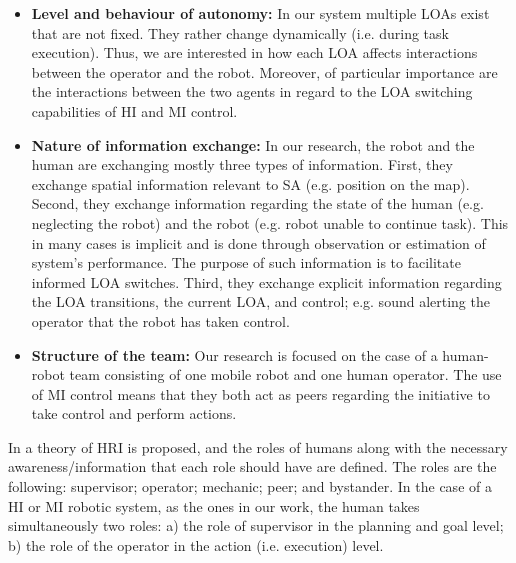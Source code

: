 \documentclass[a4paper,12pt,oneside,openright]{bhamthesis}
\begin{document}
\begin{itemize}
	
	\item \textbf{Level and behaviour of autonomy:} In our system multiple LOAs exist that are not fixed. They rather change dynamically (i.e. during task execution). Thus, we are interested in how each LOA affects interactions between the operator and the robot. Moreover, of particular importance are the interactions between the two agents in regard to the LOA switching capabilities of HI and MI control. 
	
	\item \textbf{Nature of information exchange:} In our research, the robot and the human are exchanging mostly three types of information. First, they exchange spatial information relevant to SA (e.g. position on the map). Second, they exchange information regarding the state of the human (e.g. neglecting the robot) and the robot (e.g. robot unable to continue task). This in many cases is implicit and is done through observation or estimation of system's performance. The purpose of such information is to facilitate informed LOA switches. Third, they exchange explicit information regarding the LOA transitions, the current LOA, and control; e.g. sound alerting the operator that the robot has taken control. 
	
	\item \textbf{Structure of the team:} Our research is focused on the case of a human-robot team consisting of one mobile robot and one human operator. The use of MI control means that they both act as peers regarding the initiative to take control and perform actions.
	
\end{itemize}

In \cite{Scholtz2003} a theory of HRI is proposed, and the roles of humans along with the necessary awareness/information that each role should have are defined. The roles are the following: supervisor; operator; mechanic; peer; and bystander. In the case of a HI or MI robotic system, as the ones in our work, the human takes simultaneously two roles: a) the role of supervisor in the planning and goal level; b) the role of the operator in the action (i.e. execution) level.
\end{document}
